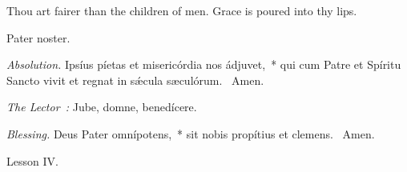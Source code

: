 {

  {
    \def\preant{\setgrefactor{17}\large}
    \def\prepsalm{\normalsize}
    \def\anttranslation{We have drunk in thy loving-kindness, O God, in the midst of thy temple.}
  }

  {
    \def\preant{\setgrefactor{17}\large}
    \def\prepsalm{\normalsize}
    \def\anttranslation{In the Lord's days shall abundance of peace arise and flourish.}
  }

  {
    \def\preant{\setgrefactor{17}\large}
    \def\prepsalm{\normalsize}
    \def\anttranslation{Truth is sprung out of the earth, and righteousness hath looked down from heaven.}
  }

  \bigskip
  {
    {Thou art fairer than the children of men.}
    {Grace is poured into thy lips.}
  }

  {
    {Pater noster.}

    \emph{Absolution.} Ipsíus píetas et misericórdia nos ádjuvet,~* qui cum Patre et Spíritu Sancto vivit et regnat in sǽcula sæculórum. \Rbar{}~Amen.

    \emph{The Lector~:} Jube, domne, benedícere.

    \emph{Blessing.} Deus Pater omnípotens,~* sit nobis propítius et clemens. \Rbar{}~Amen.
  }

  \bigskip{}
  {


  }

  {
    \hfil{Lesson IV.}\hfil

}}
